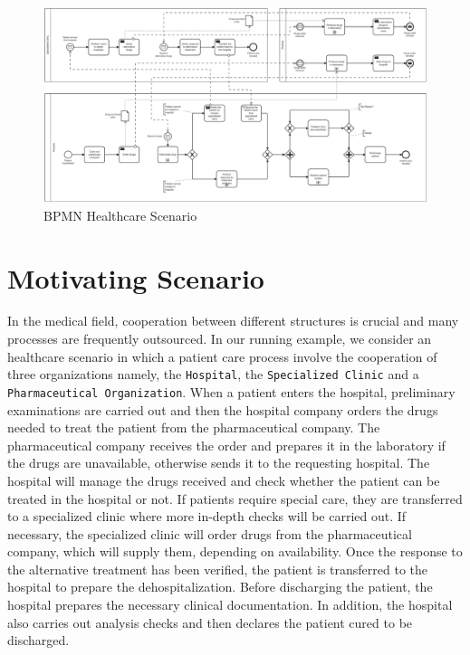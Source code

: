 
\begin{figure}[t]
\centering
\includegraphics[width=10 cm]{content/figures/healthcare_scenario.pdf}
\caption{BPMN Healthcare Scenario}
\label{fig:BPMN_Healthcare}
\end{figure}
\section{Motivating Scenario}\label{sec:motivating}
In the medical field, cooperation between different structures is crucial and many processes are frequently outsourced. In our running example, we consider an healthcare scenario in which a patient care process involve the cooperation of three organizations namely, the \texttt{Hospital}, the \texttt{Specialized Clinic} and a \texttt{Pharmaceutical Organization}.
When a patient enters the hospital, preliminary examinations are carried out and then the hospital company orders the drugs needed to treat the patient from the pharmaceutical company. The pharmaceutical company receives the order and prepares it in the laboratory if the drugs are unavailable, otherwise sends it to the requesting hospital. The hospital will manage the drugs received and check whether the patient can be treated in the hospital or not. If patients require special care, they are transferred to a specialized clinic where more in-depth checks will be carried out. If necessary, the specialized clinic will order drugs from the pharmaceutical company, which will supply them, depending on availability. Once the response to the alternative treatment has been verified, the patient is transferred to the hospital to prepare the dehospitalization. Before discharging the patient, the hospital prepares the necessary clinical documentation. In addition, the hospital also carries out analysis checks and then declares the patient cured to be discharged.


